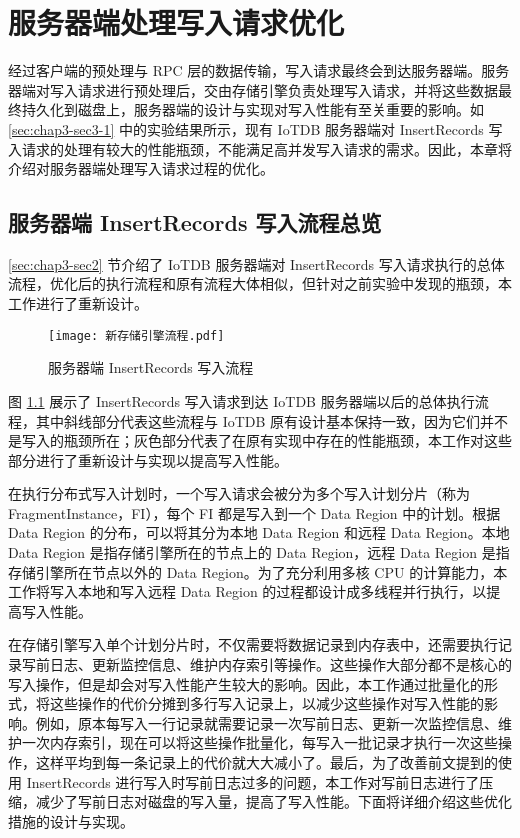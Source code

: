 
\chapter{服务器端处理写入请求优化}
经过客户端的预处理与 RPC 层的数据传输，写入请求最终会到达服务器端。服务器端对写入请求进行预处理后，交由存储引擎负责处理写入请求，并将这些数据最终持久化到磁盘上，服务器端的设计与实现对写入性能有至关重要的影响。如 \ref{sec:chap3-sec3-1} 中的实验结果所示，现有 IoTDB 服务器端对 InsertRecords 写入请求的处理有较大的性能瓶颈，不能满足高并发写入请求的需求。因此，本章将介绍对服务器端处理写入请求过程的优化。


\section{服务器端 InsertRecords 写入流程总览}
\ref{sec:chap3-sec2} 节介绍了 IoTDB 服务器端对 InsertRecords 写入请求执行的总体流程，优化后的执行流程和原有流程大体相似，但针对之前实验中发现的瓶颈，本工作进行了重新设计。

\begin{figure}
  \centering
  \texttt{[image: 新存储引擎流程.pdf]}
  \caption{服务器端 InsertRecords 写入流程}
  \label{fig:iotdb-insertRecords-flow}
\end{figure}

图 \ref{fig:iotdb-insertRecords-flow} 展示了 InsertRecords 写入请求到达 IoTDB 服务器端以后的总体执行流程，其中斜线部分代表这些流程与 IoTDB 原有设计基本保持一致，因为它们并不是写入的瓶颈所在；灰色部分代表了在原有实现中存在的性能瓶颈，本工作对这些部分进行了重新设计与实现以提高写入性能。


在执行分布式写入计划时，一个写入请求会被分为多个写入计划分片（称为 FragmentInstance，FI），每个 FI 都是写入到一个 Data Region 中的计划。根据 Data Region 的分布，可以将其分为本地 Data Region 和远程 Data Region。本地 Data Region 是指存储引擎所在的节点上的 Data Region，远程 Data Region 是指存储引擎所在节点以外的 Data Region。为了充分利用多核 CPU 的计算能力，本工作将写入本地和写入远程 Data Region 的过程都设计成多线程并行执行，以提高写入性能。

在存储引擎写入单个计划分片时，不仅需要将数据记录到内存表中，还需要执行记录写前日志、更新监控信息、维护内存索引等操作。这些操作大部分都不是核心的写入操作，但是却会对写入性能产生较大的影响。因此，本工作通过批量化的形式，将这些操作的代价分摊到多行写入记录上，以减少这些操作对写入性能的影响。例如，原本每写入一行记录就需要记录一次写前日志、更新一次监控信息、维护一次内存索引，现在可以将这些操作批量化，每写入一批记录才执行一次这些操作，这样平均到每一条记录上的代价就大大减小了。最后，为了改善前文提到的使用 InsertRecords 进行写入时写前日志过多的问题，本工作对写前日志进行了压缩，减少了写前日志对磁盘的写入量，提高了写入性能。下面将详细介绍这些优化措施的设计与实现。

